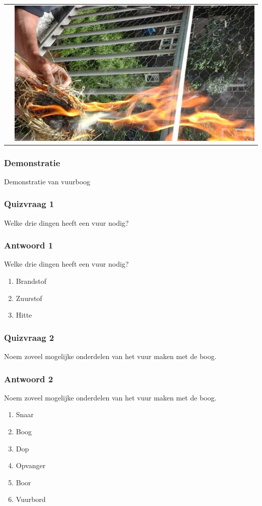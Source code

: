 \documentclass[a4paper, handout]{beamer}
\begin{document}
\begin{frame}
\begin{tabular}{ c c }
		&
		\includegraphics[height=0.40\textheight]{blazen-4}
		\\
	\end{tabular}
\end{frame}

\begin{frame}
	\frametitle{Demonstratie}
	Demonstratie van vuurboog
\end{frame}

\begin{frame}
	\frametitle{Quizvraag 1}
	Welke drie dingen heeft een vuur nodig?
\end{frame}

\begin{frame}
	\frametitle{Antwoord 1}
	Welke drie dingen heeft een vuur nodig?
	\begin{enumerate}
		\item{Brandstof}
		\item{Zuurstof}
		\item{Hitte}
	\end{enumerate}
\end{frame}
\begin{frame}
	\frametitle{Quizvraag 2}
	Noem zoveel mogelijke onderdelen van het vuur maken met de boog.
\end{frame}

\begin{frame}
	\frametitle{Antwoord 2}
	Noem zoveel mogelijke onderdelen van het vuur maken met de boog.
	\begin{enumerate}
		\item{Snaar}
		\item{Boog}
		\item{Dop}
		\item{Opvanger}
		\item{Boor}
		\item{Vuurbord}
	\end{enumerate}
\end{frame}
\end{document}
